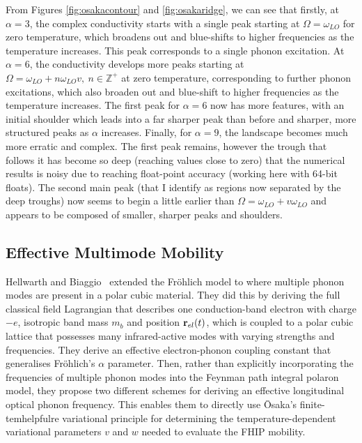 From Figures \ref{fig:osakacontour} and \ref{fig:osakaridge}, we can see that firstly, at $\alpha = 3$, the complex conductivity starts with a single peak starting at $\Omega = \omega_{LO}$ for zero temperature, which broadens out and blue-shifts to higher frequencies as the temperature increases. This peak corresponds to a single phonon excitation. At $\alpha = 6$, the conductivity develops more peaks starting at $\Omega = \omega_{LO} + n \omega_{LO} v,\ n \in \mathbb{Z}^+$ at zero temperature, corresponding to further phonon excitations, which also broaden out and blue-shift to higher frequencies as the temperature increases. The first peak for $\alpha = 6$ now has more features, with an initial shoulder which leads into a far sharper peak than before and sharper, more structured peaks as $\alpha$ increases. Finally, for $\alpha = 9$, the landscape becomes much more erratic and complex. The first peak remains, however the trough that follows it has become so deep (reaching values close to zero) that the numerical results is noisy due to reaching float-point accuracy (working here with 64-bit floats). The second main peak (that I identify as regions now separated by the deep troughs) now seems to begin a little earlier than $\Omega = \omega_{LO} + v \omega_{LO}$ and appears to be composed of smaller, sharper peaks and shoulders. 

\subsection{Effective Multimode Mobility}
\label{subsec:2-3-3}

Hellwarth and Biaggio~\cite{hellwarth_mobility_1999} extended the Fr\"ohlich model to where multiple phonon modes are present in a polar cubic material. They did this by deriving the full classical field Lagrangian that describes one conduction-band electron with charge $-e$, isotropic band mass $m_b$ and position $\vb{r}_{el}(t)$, which is coupled to a polar cubic lattice that possesses many infrared-active modes with varying strengths and frequencies. They derive an effective electron-phonon coupling constant that generalises Fr\"ohlich's $\alpha$ parameter. Then, rather than explicitly incorporating the frequencies of multiple phonon modes into the Feynman path integral polaron model, they propose two different schemes for deriving an effective longitudinal optical phonon frequency. This enables them to directly use \=Osaka's finite-temhelpfulre variational principle for determining the temperature-dependent variational parameters $v$ and $w$ needed to evaluate the FHIP mobility. 

